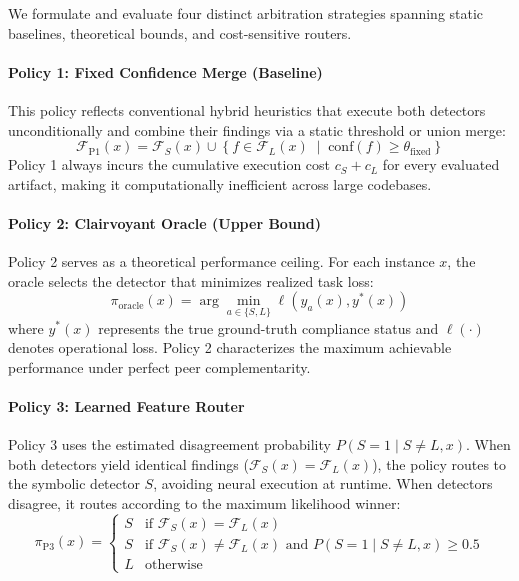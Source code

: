 We formulate and evaluate four distinct arbitration strategies spanning static baselines, theoretical bounds, and cost-sensitive routers.

\paragraph{Policy 1: Fixed Confidence Merge (Baseline)}
This policy reflects conventional hybrid heuristics that execute both detectors unconditionally and combine their findings via a static threshold or union merge:
\begin{equation}
\mathcal{F}_{\text{P1}}(x) = \mathcal{F}_S(x) \cup \left\{ f \in \mathcal{F}_L(x) \;\middle|\; \text{conf}(f) \ge \theta_{\text{fixed}} \right\}
\end{equation}
Policy 1 always incurs the cumulative execution cost $c_S + c_L$ for every evaluated artifact, making it computationally inefficient across large codebases.

\paragraph{Policy 2: Clairvoyant Oracle (Upper Bound)}
Policy 2 serves as a theoretical performance ceiling. For each instance $x$, the oracle selects the detector that minimizes realized task loss:
\begin{equation}
\pi_{\text{oracle}}(x) = \arg\min_{a \in \{S, L\}} \ell(y_a(x), y^*(x))
\end{equation}
where $y^*(x)$ represents the true ground-truth compliance status and $\ell(\cdot)$ denotes operational loss. Policy 2 characterizes the maximum achievable performance under perfect peer complementarity.

\paragraph{Policy 3: Learned Feature Router}
Policy 3 uses the estimated disagreement probability $P(S=1 \mid S \neq L, x)$. When both detectors yield identical findings ($\mathcal{F}_S(x) = \mathcal{F}_L(x)$), the policy routes to the symbolic detector $S$, avoiding neural execution at runtime. When detectors disagree, it routes according to the maximum likelihood winner:
\begin{equation}
\pi_{\text{P3}}(x) = \begin{cases}
S & \text{if } \mathcal{F}_S(x) = \mathcal{F}_L(x) \\
S & \text{if } \mathcal{F}_S(x) \neq \mathcal{F}_L(x) \text{ and } P(S = 1 \mid S \neq L, x) \ge 0.5 \\
L & \text{otherwise}
\end{cases}
\end{equation}


